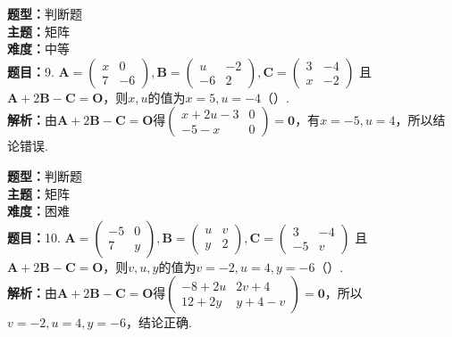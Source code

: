 \documentclass{ctexart}
\newenvironment{question}[5]{%
	\noindent\textbf{题型：}#1\\
	\textbf{主题：}#2\\
	\textbf{难度：}#3\\
	\textbf{题目：}#4\\
	\textbf{解析：}#5\\
	\vspace{1em}
}{}
\begin{document}
	\begin{question}
		{判断题}
		{矩阵}
		{中等}
		{9. \(\mathbf{A}=\left(\begin{array}{cc}x & 0 \\ 7 & -6\end{array}\right), \mathbf{B}=\left(\begin{array}{cc}u & -2 \\ -6 & 2\end{array}\right), \mathbf{C}=\left(\begin{array}{cc}3 & -4 \\ x & -2\end{array}\right)\) 且 \(\mathbf{A}+2\mathbf{B}-\mathbf{C}=\mathbf{O}\)，则\(x, u\)的值为\(x=5, u=-4\)（）.}
		{由\(\mathbf{A}+2\mathbf{B}-\mathbf{C}=\mathbf{O}\)得\(\left(\begin{array}{cc}x+2u-3 & 0 \\ -5-x & 0\end{array}\right)=\mathbf{0}\)，有\(x=-5, u=4\)，所以结论错误.}
	\end{question}
	
	\begin{question}
		{判断题}
		{矩阵}
		{困难}
		{10. \(\mathbf{A}=\left(\begin{array}{cc}-5 & 0 \\ 7 & y\end{array}\right), \mathbf{B}=\left(\begin{array}{ll}u & v \\ y & 2\end{array}\right), \mathbf{C}=\left(\begin{array}{cc}3 & -4 \\ -5 & v\end{array}\right)\) 且 \(\mathbf{A}+2\mathbf{B}-\mathbf{C}=\mathbf{O}\)，则\(v, u, y\)的值为\(v=-2, u=4, y=-6\)（）.}
		{由\(\mathbf{A}+2\mathbf{B}-\mathbf{C}=\mathbf{O}\)得\(\left(\begin{array}{cc}-8+2u & 2v+4 \\ 12+2y & y+4-v\end{array}\right)=\mathbf{0}\)，所以\(v=-2, u=4, y=-6\)，结论正确.}
	\end{question}
	
\end{document}
